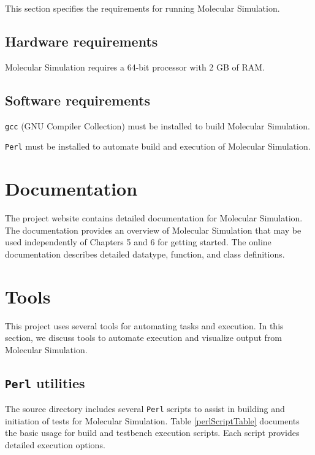 	This section specifies the requirements for running Molecular Simulation.

	\subsection{Hardware requirements}
	
	\par \noindent Molecular Simulation requires a 64-bit processor with 2 GB of RAM.  
 	
 	\subsection{Software requirements}
	
	\par \noindent \texttt{gcc} (GNU Compiler Collection) must be installed to build Molecular Simulation. \\
	
	\par \noindent \texttt{Perl} must be installed to automate build and execution of Molecular Simulation.
	

	\section{Documentation}

\noindent The project website contains detailed documentation for Molecular Simulation.  The documentation provides an overview of Molecular Simulation that may be used independently of Chapters 5 and 6 for getting started.  The online documentation describes detailed datatype, function, and class definitions.

	\section{Tools}
	
This project uses several tools for automating tasks and execution.  In this section, we discuss tools to automate execution and visualize output from Molecular Simulation.
		
		\subsection{\texttt{Perl} utilities}
		
			
The source directory includes several \texttt{Perl} scripts to assist in building and initiation of tests for Molecular Simulation.  Table \ref{perlScriptTable} documents the basic usage for build and testbench execution scripts. Each script provides detailed execution options.

